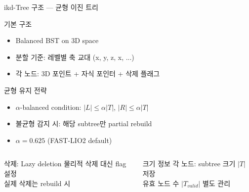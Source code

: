 \begin{frame}{ikd-Tree 구조 — 균형 이진 트리}
  \begin{block}{기본 구조}
    \begin{itemize}
      \item Balanced BST on 3D space
      \item 분할 기준: 레벨별 축 교대 (x, y, z, x, ...)
      \item 각 노드: 3D 포인트 + 자식 포인터 + 삭제 플래그
    \end{itemize}
  \end{block}
  \pause
  \begin{block}{균형 유지 전략}
    \begin{itemize}
      \item $\alpha$-balanced condition: $|L| \leq \alpha|T|$, $|R| \leq \alpha|T|$
      \item 불균형 감지 시: 해당 subtree만 partial rebuild
      \item $\alpha = 0.625$ (FAST-LIO2 default)
    \end{itemize}
  \end{block}
  \pause
  \begin{columns}
    \begin{block}{삭제: Lazy deletion}
      물리적 삭제 대신 flag 설정\\
      실제 삭제는 rebuild 시
    \end{block}
    \begin{exampleblock}{크기 정보}
      각 노드: subtree 크기 $|T|$ 저장\\
      유효 노드 수 $|T_{valid}|$ 별도 관리
    \end{exampleblock}
  \end{columns}
\end{frame}

